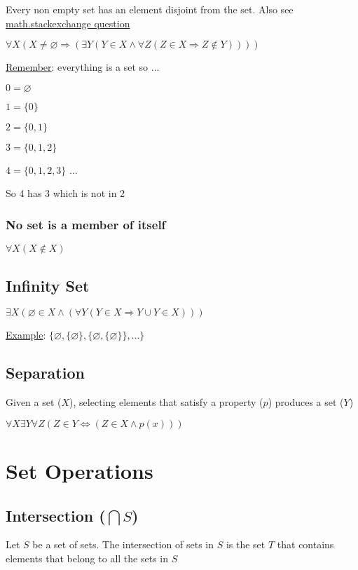 \documentclass[12pt]{article}
\begin{document}
\begin{spacing}{1.5}
Every non empty set has an element disjoint from the set. Also see \href{http://math.stackexchange.com/questions/204865/axiom-of-regularity}{math.stackexchange question}

$\forall X (X \neq \varnothing \Rightarrow (\exists Y (Y \in X \wedge \forall Z (Z \in X \Rightarrow Z \notin Y))))$

\underline{Remember}: everything is a set so ...

$0 = \varnothing$

$1 = \{0\}$

$2 = \{0, 1\}$

$3 = \{0, 1, 2\}$

$4 = \{0, 1, 2, 3\}$ ... 

So 4 has 3 which is not in 2

\subsubsection{No set is a member of itself}

$\forall X (X \notin X)$

\subsection{Infinity Set}

$\exists X (\varnothing \in X \wedge (\forall Y (Y \in X \Rightarrow Y \cup {Y} \in X)))$

\underline{Example}: $\{ \varnothing, \{\varnothing\}, \{\varnothing, \{\varnothing\}\}, ... \}$

\subsection{Separation}

Given a set ($X$), selecting elements that satisfy a property ($p$) produces a set ($Y$)

$\forall X \exists Y \forall Z (Z \in Y \Leftrightarrow (Z \in X \wedge p(x)))$

\section{Set Operations}

\subsection{Intersection ($\bigcap S$)}

Let $S$ be a set of sets. The intersection of sets in $S$ is the set $T$ that contains elements that belong to all the sets in $S$


\end{spacing}
\end{document}
